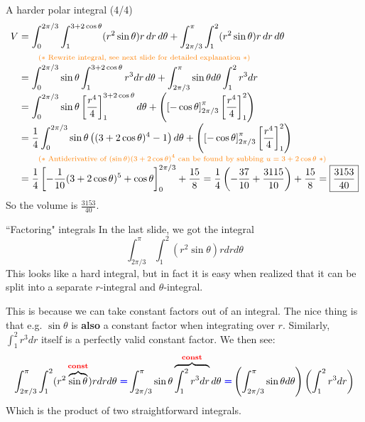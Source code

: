 \begin{frame}{A harder polar integral (4/4)}
    \footnotesize
    \begin{align*}
        V&=\int_0^{2\pi/3}\int_1^{3+2\cos\theta}(r^2\sin\theta)r\,dr\,d\theta+\int_{2\pi/3}^{\pi}\int_{1}^2(r^2\sin\theta) r\,dr\,d\theta\\[-1mm]
         &\qquad\textcolor{orange}{\text{\scriptsize ($*$ Rewrite integral, see next slide for detailed explanation $*$)}}\\[-1mm]
         &=\int_0^{2\pi/3}\sin\theta\int_1^{3+2\cos\theta}r^3dr\,d\theta+\int_{2\pi/3}^{\pi}\sin\theta d\theta\int_{1}^2r^3 dr\\[-1mm]
         &=\int_0^{2\pi/3}\sin\theta\left[\frac{r^4}{4}\right]_1^{3+2\cos\theta}d\theta+\left(\left[-\cos\theta\right]_{2\pi/3}^{\pi} \left[\frac{r^4}{4}\right]_1^2\right)\\[-1mm]
         &=\frac{1}{4}\int_0^{2\pi/3}\sin\theta\left((3+2\cos\theta)^4-1\right)d\theta+\left(\left[-\cos\theta\right]_{2\pi/3}^{\pi} \left[\frac{r^4}{4}\right]_1^2\right)\\[-1mm]
         &\qquad\textcolor{orange}{\text{\scriptsize ($*$ Antiderivative of $(\sin\theta)(3+2\cos\theta)^4$ can be found by subbing $u=3+2\cos\theta$ $*$)}}\\[-1mm]
         &=\frac{1}{4}\left[-\frac{1}{10}(3+2\cos\theta)^5+\cos\theta\right]_0^{2\pi/3}+\frac{15}{8}=\frac{1}{4}\left(-\frac{37}{10}+\frac{3115}{10}\right)+\frac{15}{8}=\boxed{\frac{3153}{40}}\\
    \end{align*}
    So the volume is $\frac{3153}{40}$.
\end{frame}

\begin{frame}{``Factoring" integrals}\label{integraltrick}
    In the last slide, we got the integral \[\int_{2\pi/3}^{\pi}\int_{1}^2(r^2\sin\theta) rdrd\theta\] This looks like a hard integral, but in fact it is easy when realized that it can be split into a separate $r$-integral and $\theta$-integral.

    This is because we can take constant factors out of an integral. The nice thing is that e.g. $\sin\theta$ is \textbf{also} a constant factor when integrating over $r$. Similarly, $\int_1^2 r^3 dr$ itself is a perfectly valid constant factor. We then see:
    {\footnotesize
    \[\int_{2\pi/3}^{\pi}\int_{1}^2(r^2\overbrace{\sin\theta}^{\textcolor{red}{\textbf{const}}}) rdrd\theta \textcolor{blue}{~\pmb{=}} \int_{2\pi/3}^{\pi}\sin\theta\overbrace{\int_{1}^2r^3 dr}^{\textcolor{red}{\textbf{const}}}d\theta \textcolor{blue}{~\pmb{=}} \left(\int_{2\pi/3}^{\pi}\sin\theta d\theta\right)\left(\int_1^2r^3dr\right)\]}
    Which is the product of two straightforward integrals.
\end{frame}


